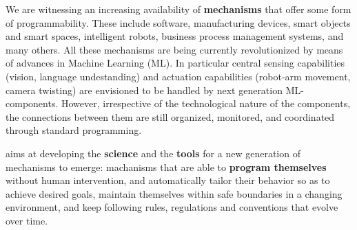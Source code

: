 



We are witnessing an increasing availability of \textbf{mechanisms} that offer
some form of programmability.
These include
software, %
manufacturing devices, %
smart objects and smart spaces, %
intelligent robots, %
business process management systems, %
and many others.
All these mechanisms are being currently revolutionized by means of
advances in Machine Learning (ML).  In particular central sensing
capabilities (vision, language undestanding) and actuation
capabilities (robot-arm movement, camera twisting) are envisioned to be handled
by next generation ML-components.
However, irrespective of the technological nature of the components, the connections between them are still
organized, monitored, and coordinated through standard programming.

\project aims at developing the \textbf{science} and the \textbf{tools} for a new
generation of mechanisms to emerge: machanisms that are able to
\textbf{program themselves} without human intervention, and
automatically tailor their behavior so as to
achieve desired goals,  maintain themselves within safe boundaries in a
changing environment, and keep following rules,
regulations and conventions that evolve over time. 

